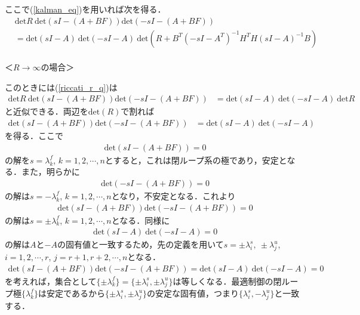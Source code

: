 ここで(\ref{kalman_eq})を用いれば次を得る．
\begin{align}
	& %
	\mbox{det}R \ \mbox{det}({sI-(A + B F)})\mbox{det}({-sI-(A + B F)})
\nonumber \\
		&= \mbox{det}(sI-A) \ \mbox{det}(-sI-A) \ 
			\mbox{det}(R + B^T (-sI - A^T)^{-1}H^T H (sI - A)^{-1} B)
\label{riccati_r_q}
\end{align}
\ \\
＜$R \rightarrow \infty$の場合＞

このときには(\ref{riccati_r_q})は
\begin{align}
	\mbox{det}R \ \mbox{det}({sI-(A + B F)})\mbox{det}({-sI-(A + B F)})
		&= \mbox{det}(sI-A) \ \mbox{det}(-sI-A) \ 
			\mbox{det} R
\end{align}
と近似できる．両辺を$\mbox{det}(R )$で割れば
\begin{align}
	\mbox{det}({sI-(A + B F)})\mbox{det}({-sI-(A + B F)})
		&= \mbox{det}(sI-A) \ \mbox{det}(-sI-A) \ 
\end{align}
を得る．ここで
\begin{align}
	\mbox{det}({sI-(A + B F)})=0
\nonumber
\end{align}
の解を$s= \lambda^f_k$, $k=1,2,\cdots,n$とすると，これは閉ループ系の極であり，安定となる．また，明らかに
\begin{align}
	\mbox{det}({-sI-(A + B F)})=0
\nonumber
\end{align}
の解は$s= -\lambda^f_k$, $k=1,2,\cdots,n$となり，不安定となる．これより
\begin{align}
	\mbox{det}({sI-(A + B F)})\mbox{det}({-sI-(A + B F)})=0
\end{align}
の解は$ s= \pm \lambda^f_k$, $k=1,2,\cdots,n$となる．同様に
\begin{align}
		 \mbox{det}(sI-A) \ \mbox{det}(-sI-A) =0
\nonumber 
\end{align}
の解は$A$と$-A$の固有値と一致するため，先の定義を用いて$ s= \pm \lambda^s_i, \ \pm \lambda^u_j$, $i=1,2,\cdots,r$, $j=r+1,r+2, \cdots, n$となる．
\begin{align}
	\mbox{det}({sI-(A + B F)})\mbox{det}({-sI-(A + B F)})
		= \mbox{det}(sI-A) \ \mbox{det}(-sI-A) =0 
\nonumber 
\end{align}
を考えれば，集合として$ \{\pm \lambda^f_k\} = \{\pm \lambda^s_i, \pm \lambda^u_j\} $は等しくなる．最適制御の閉ループ極$\{\lambda^f_k\}$は安定であるから$\{\pm \lambda^s_i, \pm \lambda^u_j\} $の安定な固有値，つまり$\{\lambda^s_i, -\lambda^u_j\} $と一致する．

